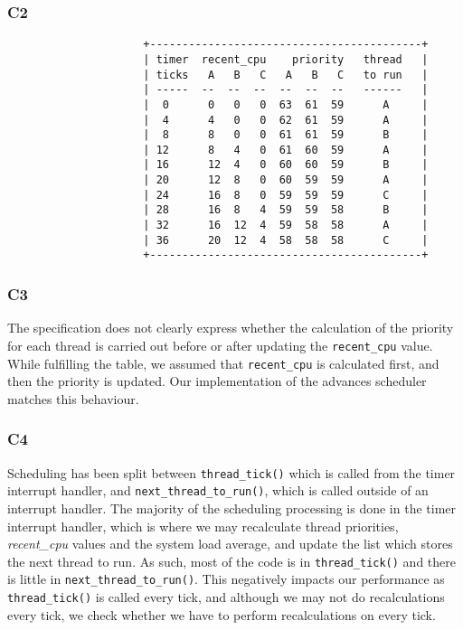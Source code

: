 \documentclass[a4wide, 11pt]{article}
\newcommand{\tx}{\texttt}
\begin{document}
\subsubsection{C2}
\begin{verbatim}     
                     +------------------------------------------+
                     | timer  recent_cpu    priority   thread   | 
                     | ticks   A   B   C   A   B   C   to run   |  
                     | -----  --  --  --  --  --  --   ------   |  
                     |  0      0   0   0  63  61  59      A     |
                     |  4      4   0   0  62  61  59      A     |  
                     |  8      8   0   0  61  61  59      B     |
                     | 12      8   4   0  61  60  59      A     |
                     | 16      12  4   0  60  60  59      B     |
                     | 20      12  8   0  60  59  59      A     |     
                     | 24      16  8   0  59  59  59      C     |
                     | 28      16  8   4  59  59  58      B     | 
                     | 32      16  12  4  59  58  58      A     |        
                     | 36      20  12  4  58  58  58      C     |
                     +------------------------------------------+
\end{verbatim}

\subsubsection{C3}

The specification does not clearly express whether the calculation of the priority for each thread is carried out before or after updating the \tx{recent\_cpu} value. While fulfilling the table, we assumed that \tx{recent\_cpu} is calculated first, and then the priority is updated. Our implementation of the advances scheduler matches this behaviour.  

\subsubsection{C4}

Scheduling has been split between \texttt{thread\_tick()} which is called from the timer interrupt handler, and \texttt{next\_thread\_to\_run()}, which is called outside of an interrupt handler. The majority of the scheduling processing is done in the timer interrupt handler, which is where we may recalculate thread priorities, \textit{recent\_cpu} values and the system load average, and update the list which stores the next thread to run. As such, most of the code is in \texttt{thread\_tick()} and there is little in \texttt{next\_thread\_to\_run()}. This negatively impacts our performance as \texttt{thread\_tick()} is called every tick, and although we may not do recalculations every tick, we check whether we have to perform recalculations on every tick.
\end{document}
